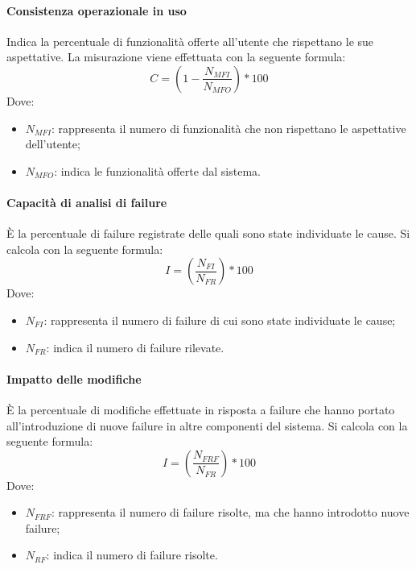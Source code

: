 \documentclass[../NormeDiProgetto.tex]{subfiles}
\begin{document}
			\paragraph{Consistenza operazionale in uso}
				Indica la percentuale di funzionalità offerte all'utente che rispettano le sue aspettative. La misurazione viene effettuata con la seguente formula:
				\begin{equation*}
					C = (1 - \frac{N_{MFI}}{N_{MFO}}) * 100
				\end{equation*}
				Dove:
				\begin{itemize}
					\item \textbf{$N_{MFI}$}:  rappresenta il numero di funzionalità che non rispettano le aspettative dell'utente;
					\item \textbf{$	N_{MFO}$}:  indica le funzionalità offerte dal sistema.
				\end{itemize}
			
			\paragraph{Capacità di analisi di failure}
				È la percentuale di failure registrate delle quali sono state individuate le cause. Si calcola con la seguente formula:
					\begin{equation*}
						I = (\frac{N_{FI}}{N_{FR}}) * 100
					\end{equation*}
					Dove:
					\begin{itemize}
						\item \textbf{$	N_{FI}$}: rappresenta il numero di failure di cui sono state individuate le cause;
						\item \textbf{$N_{FR}$}: indica il numero di failure rilevate.
					\end{itemize}

			\paragraph{Impatto delle modifiche}
				È la percentuale di modifiche effettuate in risposta a failure che hanno portato all'introduzione di nuove failure in altre componenti del sistema. Si calcola con la seguente formula:
					\begin{equation*}
						I = (\frac{N_{FRF}}{N_{FR}}) * 100
					\end{equation*}
					Dove:
					\begin{itemize}
						\item \textbf{$	N_{FRF}$}: rappresenta il numero di failure risolte, ma che hanno introdotto nuove failure;
						\item \textbf{$N_{RF}$}: indica il numero di failure risolte.
					\end{itemize}
\end{document}
